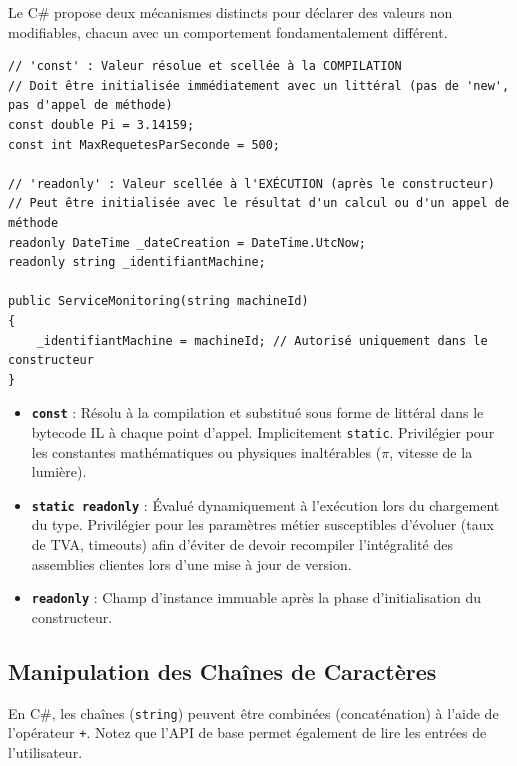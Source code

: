 Le C\# propose deux mécanismes distincts pour déclarer des valeurs non modifiables, chacun avec un comportement fondamentalement différent.

\begin{lstlisting}[caption={Déclaration de constantes et champs readonly}]
// 'const' : Valeur résolue et scellée à la COMPILATION
// Doit être initialisée immédiatement avec un littéral (pas de 'new', pas d'appel de méthode)
const double Pi = 3.14159;
const int MaxRequetesParSeconde = 500;

// 'readonly' : Valeur scellée à l'EXÉCUTION (après le constructeur)
// Peut être initialisée avec le résultat d'un calcul ou d'un appel de méthode
readonly DateTime _dateCreation = DateTime.UtcNow;
readonly string _identifiantMachine;

public ServiceMonitoring(string machineId)
{
    _identifiantMachine = machineId; // Autorisé uniquement dans le constructeur
}
\end{lstlisting}

\begin{tcolorbox}[colback=backcolour,colframe=keywordcolor,title=\textbf{Règle : \texttt{const} vs \texttt{static readonly}}]
    \begin{itemize}
        \item \textbf{\texttt{const}} : Résolu à la compilation et substitué sous forme de littéral dans le bytecode IL à chaque point d'appel. Implicitement \texttt{static}. Privilégier pour les constantes mathématiques ou physiques inaltérables ($\pi$, vitesse de la lumière).
        \item \textbf{\texttt{static readonly}} : Évalué dynamiquement à l'exécution lors du chargement du type. Privilégier pour les paramètres métier susceptibles d'évoluer (taux de TVA, timeouts) afin d'éviter de devoir recompiler l'intégralité des assemblies clientes lors d'une mise à jour de version.
        \item \textbf{\texttt{readonly}} : Champ d'instance immuable après la phase d'initialisation du constructeur.
    \end{itemize}
\end{tcolorbox}

\subsection{Manipulation des Chaînes de Caractères}

En C\#, les chaînes (\texttt{string}) peuvent être combinées (concaténation) à l'aide de l'opérateur \texttt{+}. Notez que l'API de base permet également de lire les entrées de l'utilisateur.

